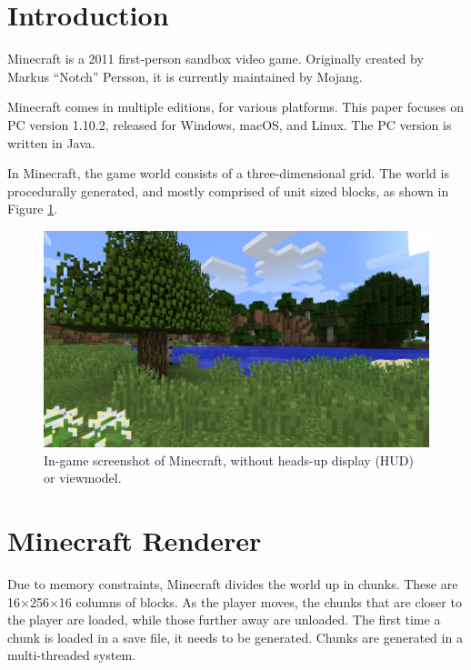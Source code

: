 \documentclass[]{article}
\renewcommand{\listoffigures}{\begingroup
\tocsection
\tocfile{\listfigurename}{lof}
\endgroup}
\begin{document}

\newpage
\tableofcontents
\newpage
\listoffigures
\newpage

\section{Introduction}
Minecraft is a 2011 first-person sandbox video game.
Originally created by Markus \enquote{Notch} Persson, it is currently maintained by Mojang.

Minecraft comes in multiple editions, for various platforms. This paper focuses on PC version 1.10.2, released for Windows, macOS, and Linux.
The PC version is written in Java.

In Minecraft, the game world consists of a three-dimensional grid.
The world is procedurally generated, and mostly comprised of unit sized blocks, as shown in Figure \ref{fig:ss-worldgen}.

\begin{figure}
  \includegraphics[width=\textwidth]{ss-worldgen.png}
  \centering
  \caption{In-game screenshot of Minecraft, without heads-up display (HUD) or viewmodel.}
  \label{fig:ss-worldgen}
\end{figure}

\section{Minecraft Renderer}
Due to memory constraints, Minecraft divides the world up in chunks.
These are 16$\times$256$\times$16 columns of blocks.
As the player moves, the chunks that are closer to the player are loaded, while those further away are unloaded.
The first time a chunk is loaded in a save file, it needs to be generated.
Chunks are generated in a multi-threaded system.
\end{document}
